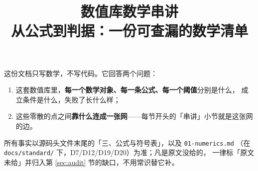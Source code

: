 \documentclass[11pt,a4paper]{ctexart}
\title{\bfseries 数值库数学串讲\\[0.3em]
\large 从公式到判据：一份可查漏的数学清单}
\author{}
\date{}
\begin{document}
\maketitle

\noindent
这份文档只写数学，不写代码。它回答两个问题：
\begin{enumerate}[label=\arabic*.]
  \item 这套数值库里，\textbf{每一个数学对象、每一条公式、每一个阈值}分别是什么，
        成立条件是什么，失败了长什么样；
  \item 这些零散的点之间\textbf{靠什么连成一张网}——每节开头的「串讲」小节就是这张网的边。
\end{enumerate}

\begingroup\sloppy
\noindent
所有事实以源码头文件末尾的「三、公式与符号表」，以及 \texttt{01-numerics.md}
（在 \texttt{docs/standard/} 下，D7/D12/D19/D20）为准；凡是原文没给的，
一律标「原文未给」并归入第 \ref{sec:audit} 节的缺口，不用常识替它补。
\par\endgroup

\tableofcontents
\clearpage













\end{document}
